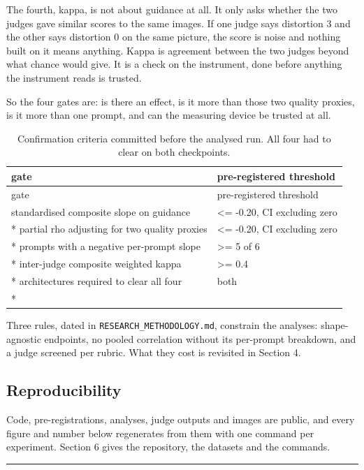 \documentclass[11pt]{article}
\begin{document}
The fourth, kappa, is not about guidance at all. It only asks whether the two
judges gave similar scores to the same images. If one judge says distortion 3
and the other says distortion 0 on the same picture, the score is noise and
nothing built on it means anything. Kappa is agreement between the two judges
beyond what chance would give. It is a check on the instrument, done before
anything the instrument reads is trusted.

So the four gates are: is there an effect, is it more than those two quality
proxies, is it more than one prompt, and can the measuring device be trusted at
all.

\begin{longtable}[]{@{}ll@{}}
\caption{Confirmation criteria committed before the analysed run. All four had
to clear on both checkpoints.}\tabularnewline
\toprule\noalign{}
gate & pre-registered threshold \\
\midrule\noalign{}
\endfirsthead
\toprule\noalign{}
gate & pre-registered threshold \\
\midrule\noalign{}
\endhead
\bottomrule\noalign{}
\endlastfoot
standardised composite slope on guidance & \textless= -0.20, CI excluding
zero \\*
partial rho adjusting for two quality proxies & \textless= -0.20, CI excluding
zero \\*
prompts with a negative per-prompt slope & \textgreater= 5 of 6 \\*
inter-judge composite weighted kappa & \textgreater= 0.4 \\*
architectures required to clear all four & both \\*
\end{longtable}

Three rules, dated in \texttt{RESEARCH\_METHODOLOGY.md}, constrain the analyses:
shape-agnostic endpoints, no pooled correlation without its per-prompt
breakdown, and a judge screened per rubric. What they cost is revisited in
Section 4.

\subsection{Reproducibility}\label{reproducibility}

Code, pre-registrations, analyses, judge outputs and images are public, and
every figure and number below regenerates from them with one command per
experiment. Section 6 gives the repository, the datasets and the commands.

\begin{center}\rule{0.5\linewidth}{0.5pt}\end{center}
\end{document}
